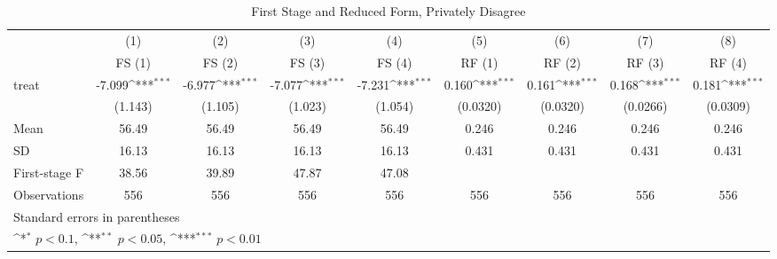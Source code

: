 \begin{table}[htbp]\centering
\def\sym#1{\ifmmode^{#1}\else\(^{#1}\)\fi}
\caption{First Stage and Reduced Form, Privately Disagree}
\begin{tabular}{l*{8}{c}}
\hline\hline
                      &\multicolumn{1}{c}{(1)}&\multicolumn{1}{c}{(2)}&\multicolumn{1}{c}{(3)}&\multicolumn{1}{c}{(4)}&\multicolumn{1}{c}{(5)}&\multicolumn{1}{c}{(6)}&\multicolumn{1}{c}{(7)}&\multicolumn{1}{c}{(8)}\\
                      &\multicolumn{1}{c}{FS (1)}&\multicolumn{1}{c}{FS (2)}&\multicolumn{1}{c}{FS (3)}&\multicolumn{1}{c}{FS (4)}&\multicolumn{1}{c}{RF (1)}&\multicolumn{1}{c}{RF (2)}&\multicolumn{1}{c}{RF (3)}&\multicolumn{1}{c}{RF (4)}\\
\hline
treat                 &   -7.099\sym{***}&   -6.977\sym{***}&   -7.077\sym{***}&   -7.231\sym{***}&    0.160\sym{***}&    0.161\sym{***}&    0.168\sym{***}&    0.181\sym{***}\\
                      &  (1.143)         &  (1.105)         &  (1.023)         &  (1.054)         & (0.0320)         & (0.0320)         & (0.0266)         & (0.0309)         \\
\hline
Mean                  &    56.49         &    56.49         &    56.49         &    56.49         &    0.246         &    0.246         &    0.246         &    0.246         \\
SD                    &    16.13         &    16.13         &    16.13         &    16.13         &    0.431         &    0.431         &    0.431         &    0.431         \\
First-stage F         &    38.56         &    39.89         &    47.87         &    47.08         &                  &                  &                  &                  \\
Observations          &      556         &      556         &      556         &      556         &      556         &      556         &      556         &      556         \\
\hline\hline
\multicolumn{9}{l}{\footnotesize Standard errors in parentheses}\\
\multicolumn{9}{l}{\footnotesize \sym{*} \(p<0.1\), \sym{**} \(p<0.05\), \sym{***} \(p<0.01\)}\\
\end{tabular}
\end{table}

